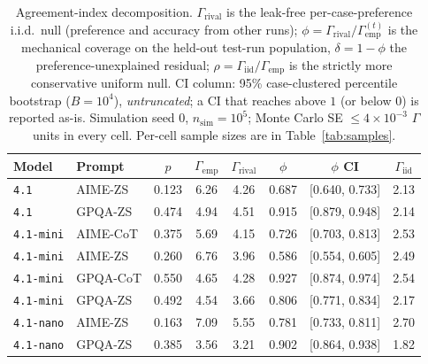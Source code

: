 \documentclass[a4paper,fleqn]{cas-sc}
\newcommand{\agreementIndex}{\Gamma}
\begin{document}
\begin{table}[t]
\centering
\caption{Agreement-index decomposition. $\agreementIndex_{\mathrm{rival}}$ is the
leak-free per-case-preference i.i.d.\ null (preference and accuracy from
other runs); $\phi=\agreementIndex_{\mathrm{rival}}/\agreementIndex_{\mathrm{emp}}^{(t)}$ is
the mechanical coverage on the held-out test-run population,
$\delta=1-\phi$ the preference-unexplained residual; $\rho=\agreementIndex_{\mathrm{iid}}/\agreementIndex_{\mathrm{emp}}$
is the strictly more conservative uniform null. CI column: 95\%
case-clustered percentile bootstrap ($B=10^4$), \emph{untruncated}; a CI
that reaches above $1$ (or below $0$) is reported as-is. Simulation
seed 0, $n_{\mathrm{sim}}=10^5$; Monte Carlo SE $\le4\times10^{-3}$
$\agreementIndex$ units in every cell. Per-cell sample sizes are in
Table~\ref{tab:samples}.}
\label{tab:kappa}
\begin{tabular*}{\linewidth}{@{\extracolsep{\fill}} llcccccc @{}}
\toprule
Model & Prompt & $p$ & $\agreementIndex_{\mathrm{emp}}$ & $\agreementIndex_{\mathrm{rival}}$ & $\phi$ & $\phi$ CI & $\agreementIndex_{\mathrm{iid}}$ \\
\midrule
\texttt{4.1} & AIME-ZS & 0.123 & 6.26 & 4.26 & 0.687 & [0.640, 0.733] & 2.13 \\
\texttt{4.1} & GPQA-ZS & 0.474 & 4.94 & 4.51 & 0.915 & [0.879, 0.948] & 2.14 \\
\texttt{4.1-mini} & AIME-CoT & 0.375 & 5.69 & 4.15 & 0.726 & [0.703, 0.813] & 2.53 \\
\texttt{4.1-mini} & AIME-ZS & 0.260 & 6.76 & 3.96 & 0.586 & [0.554, 0.605] & 2.49 \\
\texttt{4.1-mini} & GPQA-CoT & 0.550 & 4.65 & 4.28 & 0.927 & [0.874, 0.974] & 2.54 \\
\texttt{4.1-mini} & GPQA-ZS & 0.492 & 4.54 & 3.66 & 0.806 & [0.771, 0.834] & 2.17 \\
\texttt{4.1-nano} & AIME-ZS & 0.163 & 7.09 & 5.55 & 0.781 & [0.733, 0.811] & 2.70 \\
\texttt{4.1-nano} & GPQA-ZS & 0.385 & 3.56 & 3.21 & 0.902 & [0.864, 0.938] & 1.82 \\
\bottomrule
\end{tabular*}
\end{table}
\end{document}
